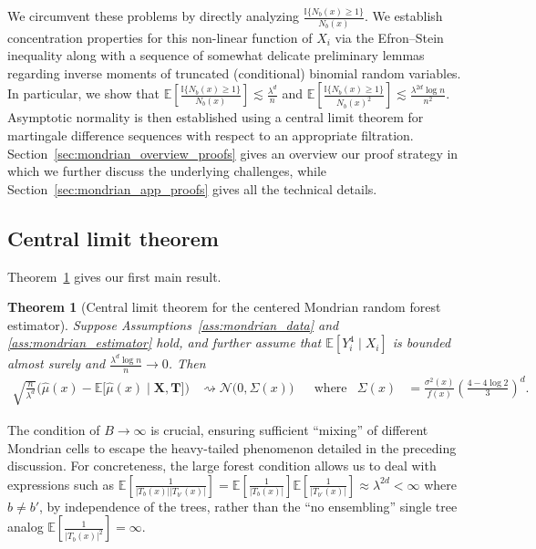 \documentclass[11pt,lof]{puthesis}
\newcommand{\E}{\ensuremath{\mathbb{E}}}
\newcommand{\I}{\ensuremath{\mathbb{I}}}
\newcommand{\bX}{\ensuremath{\mathbf{X}}}
\newcommand{\bT}{\ensuremath{\mathbf{T}}}
\newcommand{\cN}{\ensuremath{\mathcal{N}}}
\theoremstyle{break}
\newtheorem{theorem}{Theorem}[section]
\theoremstyle{proof}
\begin{document}
We circumvent these problems by directly analyzing
$\frac{\I\{N_b(x) \geq 1\}}{N_b(x)}$. We establish concentration properties for
this non-linear function of $X_i$ via the Efron--Stein inequality
\citep[Section 3.1]{boucheron2013concentration} along with a sequence of
somewhat delicate preliminary lemmas regarding inverse moments of truncated
(conditional) binomial random variables. In particular, we show that
$\E \left[ \frac{\I \{N_b(x) \geq 1\}}{N_b(x)} \right]
\lesssim \frac{\lambda^d}{n}$ and
$\E \left[ \frac{\I \{N_b(x) \geq 1\}}{N_b(x)^2} \right]
\lesssim \frac{\lambda^{2d} \log n}{n^2}$.
Asymptotic normality is then established using a central limit theorem for
martingale difference sequences \citep[Theorem~3.2]{hall1980martingale} with
respect to an appropriate filtration.
Section~\ref{sec:mondrian_overview_proofs} gives
an overview our proof strategy in which we further discuss the underlying
challenges, while Section~\ref{sec:mondrian_app_proofs} gives all the technical
details.

\subsection{Central limit theorem}
\label{sec:mondrian_clt}

Theorem~\ref{thm:mondrian_clt} gives our first main result.

\begin{theorem}[Central limit theorem for the centered
Mondrian random forest estimator]%
\label{thm:mondrian_clt}
%
Suppose Assumptions~\ref{ass:mondrian_data} and \ref{ass:mondrian_estimator}
hold, and further assume that
$\E[Y_i^4 \mid X_i ]$ is bounded almost surely
and $\frac{\lambda^d \log n}{n} \to 0$. Then
%
\begin{align*}
\sqrt{\frac{n}{\lambda^d}}
\Big( \hat \mu(x) - \E \big[ \hat \mu(x) \mid \bX, \bT \big] \Big)
&\rightsquigarrow \cN\big(0, \Sigma(x)\big)
& &\text{where}
&\Sigma(x) &=
\frac{\sigma^2(x)}{f(x)} \left( \frac{4 - 4 \log 2}{3 } \right)^d.
\end{align*}
\end{theorem}

The condition of $B \to \infty$ is crucial, ensuring sufficient ``mixing'' of
different Mondrian cells to escape the heavy-tailed phenomenon detailed in the
preceding discussion. For concreteness, the large forest condition allows us to
deal with expressions such as
$\E \left[ \frac{1}{|T_b(x)| |T_{b'}(x)|} \right]
= \E \left[ \frac{1}{|T_b(x)|} \right] \E \left[ \frac{1}{|T_{b'}(x)|} \right]
\approx \lambda^{2d} < \infty$
where $b \neq b'$, by independence of the trees, rather than the ``no
ensembling'' single tree analog
$\E \left[ \frac{1}{|T_b(x)|^2} \right] = \infty$.
\end{document}
